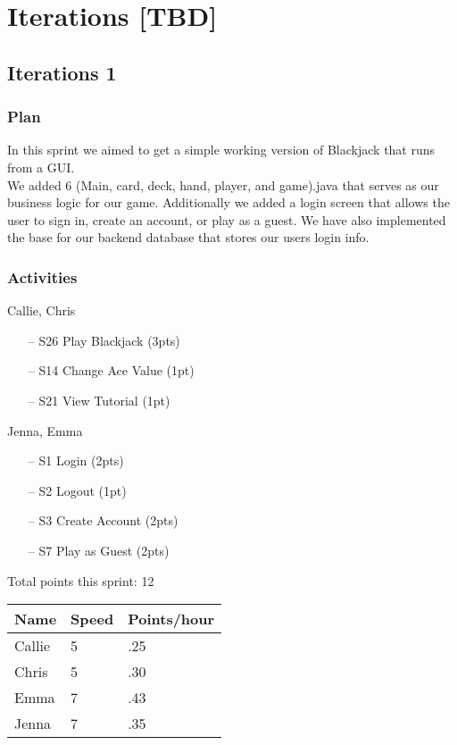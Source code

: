 \section{Iterations \textbf{[TBD]}} 
\subsection{Iterations 1}
\subsubsection{Plan}
In this sprint we aimed to get a simple working version of Blackjack that runs from a GUI.\\

We added 6 (Main, card, deck, hand, player, and game).java that serves as our business logic for our game. Additionally we added a login screen that allows the user to sign in, create an account, or play as a guest. We have also implemented the base for our backend database that stores our users login info. 

\subsubsection{Activities}
Callie, Chris 
\begin{itemize}
    \item [--] S26 Play Blackjack (3pts) 
    \item [--] S14 Change Ace Value (1pt)
    \item [--] S21 View Tutorial (1pt)
\end{itemize} 
Jenna, Emma
\begin{itemize}
    \item [--] S1 Login (2pts) 
    \item [--] S2 Logout (1pt)
    \item [--] S3 Create Account (2pts)
    \item [--] S7 Play as Guest (2pts)
\end{itemize} 

Total points this sprint: 12

\begin{table}[!hbt]
\begin{tabular}{lll}
\hline
\multicolumn{1}{|c|}{\textbf{Name}} & \multicolumn{1}{c|}{\textbf{Speed}} & \multicolumn{1}{c|}{\textbf{Points/hour}} \\ \hline
Callie                              & 5                                   & .25                                          \\
Chris                               & 5                                   & .30                                         \\
Emma                                & 7                                   & .43                                          \\
Jenna                               & 7                                   & .35                                        
\end{tabular}
\end{table}

